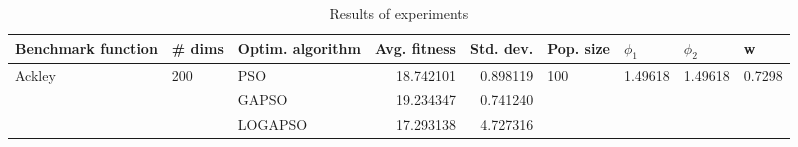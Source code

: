 \begin{table}
\centering
\caption{Results of experiments}
\begin{tabular}{lllrrllll}
\toprule
     Benchmark function &              \# dims & Optim. algorithm &  Avg. fitness &  Std. dev. &            Pop. size &               $\phi_{1}$ &               $\phi_{2}$ &                       w \\
\midrule
\multirow{3}{*}{Ackley} & \multirow{3}{*}{200} &              PSO &     18.742101 &   0.898119 & \multirow{3}{*}{100} & \multirow{3}{*}{1.49618} & \multirow{3}{*}{1.49618} & \multirow{3}{*}{0.7298} \\
                        &                      &            GAPSO &     19.234347 &   0.741240 &                      &                          &                          &                         \\
                        &                      &          LOGAPSO &     17.293138 &   4.727316 &                      &                          &                          &                         \\
\bottomrule
\end{tabular}
\end{table}
